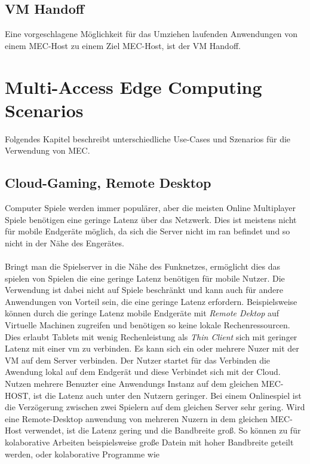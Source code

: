 \documentclass[runningheads]{llncs}
\numberwithin{figure}{section}
\begin{document}
\subsection{VM Handoff}
Eine vorgeschlagene Möglichkeit \cite{etsiETSIGSMEC} für das Umziehen laufenden Anwendungen von einem MEC-Host zu einem Ziel MEC-Host, 
ist der VM Handoff. \cite{Ha2015AdaptiveVH}
\newpage

\section{Multi-Access Edge Computing Scenarios}
\label{sec:Anwendungen}
Folgendes Kapitel beschreibt unterschiedliche Use-Cases und Szenarios für die Verwendung von MEC.\cite{patelContributorHuaweiVice}
\subsection{Cloud-Gaming, Remote Desktop}
\label{subsec:Cloud-Gaming}
Computer Spiele werden immer populärer, aber die meisten Online Multiplayer Spiele benötigen eine geringe 
Latenz über das Netzwerk. Dies ist meistens nicht für mobile Endgeräte möglich, da sich die Server nicht im \acrshort{ran} befindet und so
nicht in der Nähe des Engerätes.
\\
\\
Bringt man die Spielserver in die Nähe des Funknetzes, ermöglicht dies das spielen von Spielen die eine geringe Latenz benötigen
für mobile Nutzer. 
Die Verwendung ist dabei nicht auf Spiele beschränkt und kann auch für andere Anwendungen von Vorteil sein, 
die eine geringe Latenz erfordern. Beispielsweise können durch die geringe Latenz mobile Endgeräte mit \textit{Remote Dektop} auf
Virtuelle Machinen zugreifen und benötigen so keine lokale Rechenressourcen. Dies erlaubt Tablets mit wenig Rechenleistung als 
\textit{Thin Client} sich mit geringer Latenz mit einer \acrshort{vm} zu verbinden.
Es kann sich ein oder mehrere Nuzer mit der VM auf dem Server verbinden. 
Der Nutzer startet für das Verbinden
die Awendung lokal auf dem Endgerät und diese Verbindet sich mit der Cloud. Nutzen mehrere Benuzter eine Anwendungs Instanz auf dem 
gleichen MEC-HOST, ist die Latenz auch unter den Nutzern geringer. Bei einem Onlinespiel ist die Verzögerung zwischen zwei Spielern
auf dem gleichen Server sehr gering. Wird eine Remote-Desktop anwendung von mehreren Nuzern in dem gleichen MEC-Host verwendet, 
ist die Latenz gering und die Bandbreite groß. 
So können zu für kolaborative Arbeiten beispielsweise große Datein mit hoher Bandbreite geteilt werden, oder kolaborative Programme wie
\end{document}
